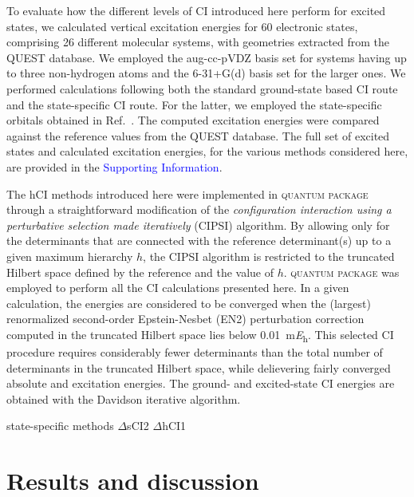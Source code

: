\documentclass[aip,jcp,reprint,noshowkeys,superscriptaddress]{revtex4-1}
\newcommand{\SupInf}{\textcolor{blue}{Supporting Information}}
\newcommand{\QP}{\textsc{quantum package}}
\begin{document}
To evaluate how the different levels of CI introduced here perform for excited states,
we calculated vertical excitation energies for 60 electronic states, comprising 26 different molecular systems, with geometries extracted from the QUEST database. \cite{Veril_2021}
We employed the aug-cc-pVDZ basis set for systems having up to three non-hydrogen atoms and the 6-31+G(d) basis set for the larger ones.
We performed calculations following both the standard ground-state based CI route and the state-specific CI route. \cite{Kossoski_2023}
For the latter, we employed the state-specific orbitals obtained in Ref.~.
The computed excitation energies were compared against the reference values from the QUEST database. \cite{Veril_2021}
The full set of excited states and calculated excitation energies, for the various methods considered here, are provided in the {\SupInf}.

The hCI methods introduced here were implemented in {\QP} \cite{Garniron_2019} through a straightforward modification of the
\textit{configuration interaction using a perturbative selection made iteratively} (CIPSI) algorithm. \cite{Huron_1973,Giner_2013,Giner_2015,Garniron_2018}
By allowing only for the determinants that are connected with the reference determinant(s) up to a given maximum hierarchy $h$,
the CIPSI algorithm is restricted to the truncated Hilbert space defined by the reference and the value of $h$.
{\QP} \cite{Garniron_2019} was employed to perform all the CI calculations presented here.
In a given calculation, the energies are considered to be converged when the (largest) renormalized second-order Epstein-Nesbet (EN2) perturbation correction computed in the truncated Hilbert space 
lies below \SI{0.01}{\milli\hartree}. \cite{Garniron_2018}
This selected CI procedure requires considerably fewer determinants than the total number of determinants in the truncated Hilbert space,
while delievering fairly converged absolute and excitation energies.
The ground- and excited-state CI energies are obtained with the Davidson iterative algorithm. \cite{Davidson_1975}

state-specific methods
$\Delta$sCI2 
$\Delta$hCI1


\section{Results and discussion}
\label{sec:res}
\end{document}
